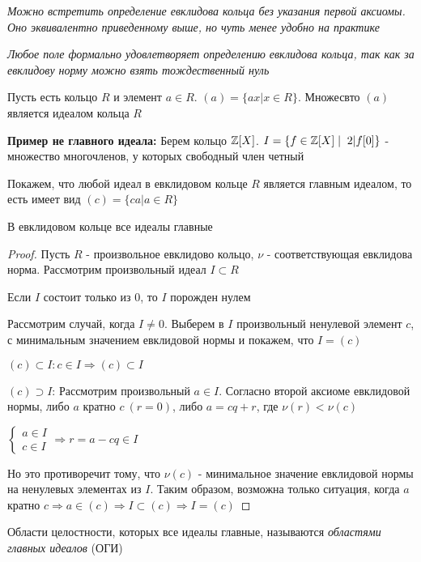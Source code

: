 \begin{normalsize}
    \notice \textit{ Можно встретить определение евклидова кольца без указания первой аксиомы. Оно эквивалентно
    приведенному выше, но чуть менее удобно на практике}

    \notice \textit{ Любое поле формально удовлетворяет определению евклидова кольца, так как за евклидову 
    норму можно взять тождественный нуль}
    
    \begin{conj}
        Пусть есть кольцо $R$ и элемент $a \in R$. $(a) = \{ax | x \in R\}$. 
        Множесвто $(a)$ является идеалом кольца $R$
    \end{conj}

    \textbf{Пример не главного идеала: } 
    Берем кольцо $\mathbb{Z}[X]$. $I = \{f \in \mathbb{Z}[X] \mid \; 2| f[0]\}$ -  множество многочленов, 
    у которых свободный член четный

    \qquad Покажем, что любой идеал в евклидовом кольце $R$ является главным идеалом,
    то есть имеет вид $(c) = \{ca|a \in R\}$

    \begin{theorem-non}
        В евклидовом кольце все идеалы главные
    \end{theorem-non}
    \begin{proof}
        Пусть $R$ - произвольное евклидово кольцо, $\nu$ - соответствующая евклидова норма.
        Рассмотрим произвольный идеал $I \subset R$

        Если $I$ состоит только из $0$, то $I$ порожден нулем 

        Рассмотрим случай, когда $I \neq 0$. Выберем в $I$ 
        произвольный ненулевой элемент $c$, с минимальным значением евклидовой нормы и покажем, что $I = (c)$
        
        $(c) \subset I: c \in I \Longrightarrow (c) \subset I$

        $(c) \supset I$: Рассмотрим произвольный $a \in I$. Согласно второй аксиоме евклидовой нормы,
        либо $a$ кратно $c \ (r = 0)$, либо $a = cq + r$, где $\nu(r) < \nu(c)$
        
        $\begin{cases}
            a \in I \\
            c \in I
        \end{cases} \Longrightarrow r = a - cq \in I$

        Но это противоречит тому, что $\nu(c)$ - минимальное значение евклидовой нормы 
        на ненулевых элементах из $I$. Таким образом, возможна только ситуация, когда $a$ кратно $c \Longrightarrow a \in (c) 
        \Longrightarrow I \subset (c) \Longrightarrow I = (c)$ 
    \end{proof}
    \begin{conj}
        Области целостности,  которых все идеалы главные, называются \textit{областями главных идеалов} (ОГИ)       
    \end{conj}
\end{normalsize}